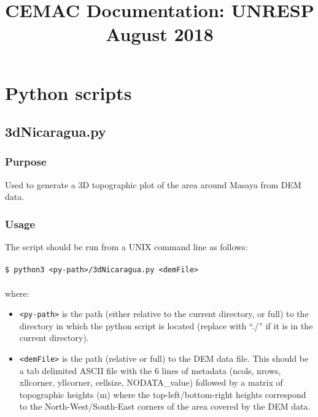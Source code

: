 \documentclass[10pt,a4paper]{article}
\title{CEMAC Documentation: UNRESP August 2018}
\newcommand\tab[1][0.5cm]{\hspace*{#1}}
\begin{document}
\maketitle
\tableofcontents

\section{Python scripts}

\subsection{3dNicaragua.py}

\subsubsection{Purpose}

Used to generate a 3D topographic plot of the area around Masaya from DEM data.

\subsubsection{Usage}
The script should be run from a UNIX command line as follows:\\\\
\tab \texttt{\$ python3 <py-path>/3dNicaragua.py <demFile>}\\\\
where:
\begin{itemize}
\item \texttt{<py-path>} is the path (either relative to the current directory, or full) to the directory in which the python script is located (replace with “./” if it is in the current directory).
\item \texttt{<demFile>} is the path (relative or full) to the DEM data file. This should be a tab delimited ASCII file with the 6 lines of metadata (ncols, nrows, xllcorner, yllcorner, cellsize, NODATA\_value) followed by a matrix of topographic heights (m) where the top-left/bottom-right heights correspond to the North-West/South-East corners of the area covered by the DEM data.
\end{itemize}
\end{document}
